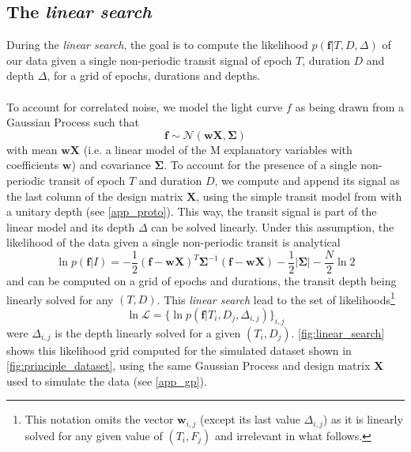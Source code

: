 \documentclass{aastex631}
\begin{document}
\subsection{The \textit{linear search}}\label{linear_search}

During the \textit{linear search}, the goal is to compute the likelihood $p(\bm{f} \vert T , D, \Delta)$ of our data given a single non-periodic transit signal of epoch $T$, duration $D$ and depth $\Delta$, for a grid of epochs, durations and depths.
\\\\
To account for correlated noise, we model the light curve $f$ as being drawn from a Gaussian Process such that
$$\bm{f} \sim \mathcal{N}(\bm{w X}, \bm{\Sigma})$$
with mean $\bm{wX}$ (i.e. a linear model of the M explanatory variables with coefficients $\bm{w}$) and covariance $\bm{\Sigma}$. To account for the presence of a single non-periodic transit of epoch $T$ and duration $D$, we compute and append its signal as the last column of the design matrix $\bm{X}$, using the simple transit model from \citealt{protopapas} with a unitary depth (see \autoref{app_proto}). This way, the transit signal is part of the linear model and its depth $\Delta$ can be solved linearly. Under this assumption, the likelihood of the data given a single non-periodic transit is analytical
\begin{equation} \label{eq:linear_search_ll}
    \ln p(\bm{f} \vert I) = -\frac{1}{2}(\bm{f}-\bm{wX})^T\bm{\Sigma}^{-1}(\bm{f}-\bm{wX}) -  \frac{1}{2}\vert\bm{\Sigma}\vert - \frac{N}{2}\ln 2
\end{equation}
and can be computed on a grid of epochs and durations, the transit depth being linearly solved for any $(T, D)$. This \textit{linear search} lead to the set of likelihoods\footnote{This notation omits the vector $\bm{w}_{i,j}$ (except its last value $\Delta_{i,j}$) as it is linearly solved for any given value of $(T_i, F_j)$ and irrelevant in what follows.}
$$\ln\mathcal{L} = \{\ln p(\bm{f} \vert T_i ,D_j, \Delta_{i,j})\}_{i, j}$$
were $\Delta_{i,j}$ is the depth linearly solved for a given $(T_i, D_j)$. \autoref{fig:linear_search} shows this likelihood grid computed for the simulated dataset shown in \autoref{fig:principle_dataset}, using the same Gaussian Process and design matrix $\bm{X}$ used to simulate the data (see \autoref{app_gp}).
\end{document}
